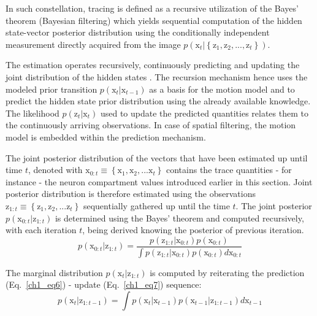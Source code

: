 In such constellation, tracing is defined as a recursive utilization of the Bayes' theorem (Bayesian filtering) which yields sequential computation of the hidden state-vector posterior distribution using the conditionally independent measurement directly acquired from the image $ p(\mathrm{x}_t |  \left\lbrace  \mathrm{z}_1, \mathrm{z}_2, ..., \mathrm{z}_t \right\rbrace  ) $.

The estimation operates recursively, continuously predicting and updating the joint distribution of the hidden states \cite{doucet2001introduction}. The recursion mechanism hence uses the modeled prior transition $ p(\mathrm{x}_t | \mathrm{x}_{t-1}) $ as a basis for the motion model and to predict the hidden state prior distribution using the already available knowledge. The likelihood $ p(\mathrm{z}_t | \mathrm{x}_t) $ used to update the predicted quantities relates them to the continuously arriving observations. In case of spatial filtering, the motion model is embedded within the prediction mechanism.

The joint posterior distribution of the vectors that have been estimated up until time $t$, denoted with $\mathrm{x}_{0:t} \equiv \left\lbrace \mathrm{x}_1, \mathrm{x}_2, ... \mathrm{x}_t \right\rbrace  $ contains the trace quantities - for instance - the neuron compartment values introduced earlier in this section. Joint posterior distribution is therefore estimated using the observations $\mathrm{z}_{1:t} \equiv \left\lbrace \mathrm{z}_1, \mathrm{z}_2, ... \mathrm{z}_t \right\rbrace $ sequentially gathered up until the time $t$. The joint posterior $ p(\mathrm{x}_{0:t} | \mathrm{z}_{1:t}) $ is determined using the Bayes' theorem \cite{doucet2001introduction,ristic2004beyond} and computed recursively, with each iteration $t$, being derived knowing the posterior of previous iteration.
\begin{equation}
p(\mathrm{x}_{0:t} | \mathrm{z}_{1:t}) = \frac{p(\mathrm{z}_{1:t} | \mathrm{x}_{0:t}) p(\mathrm{x}_{0:t})}{\int p(\mathrm{z}_{1:t} | \mathrm{x}_{0:t}) p(\mathrm{x}_{0:t}) d\mathrm{x}_{0:t} }
\label{ch1_eq5}
\end{equation}
 
The marginal distribution $ p(\mathrm{x}_t | \mathrm{z}_{1:t}) $ is computed by reiterating the prediction (Eq.~\ref{ch1_eq6}) - update (Eq.~\ref{ch1_eq7}) sequence:
\begin{equation}
p(\mathrm{x}_t | \mathrm{z}_{1:t-1}) = \int p(\mathrm{x}_t | \mathrm{x}_{t-1}) p(\mathrm{x}_{t-1} | \mathrm{z}_{1:t-1}) d\mathrm{x}_{t-1}
\label{ch1_eq6}
\end{equation}

